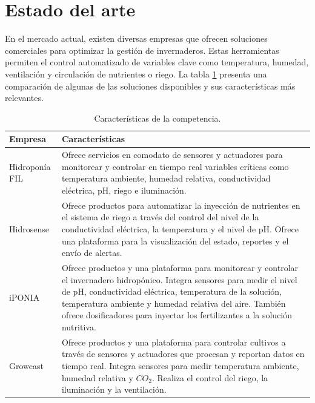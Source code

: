 
\section{Estado del arte}

En el mercado actual, existen diversas empresas que ofrecen soluciones
comerciales para optimizar la gestión de invernaderos. Estas herramientas
permiten el control automatizado de variables clave como temperatura, humedad,
ventilación y circulación de nutrientes o riego. La tabla \ref{tab:competencia}
presenta una comparación de algunas de las soluciones disponibles y sus
características más relevantes.

\begin{table}[ht]
      \centering
      \caption{Características de la competencia.}
      \begin{tabular}{|p{3.2cm}|p{9.6cm}|}
            \hline
            \rowcolor[HTML]{C0C0C0}
            Empresa                                              & Características                                                                  \\ \hline
            \multirow{1}{*}{Hidroponía FIL \cite{HidroponiaFIL}} & Ofrece servicios en comodato de sensores y actuadores
            para monitorear y controlar en tiempo real variables críticas como temperatura ambiente, humedad relativa, conductividad
            eléctrica, pH, riego e iluminación.                                                                                                     \\ \hline
            \multirow{1}{*}{Hidrosense \cite{Hidrosense}}        & Ofrece productos para automatizar la inyección de nutrientes en el sistema
            de riego a través del control del nivel de la conductividad eléctrica, la temperatura y el nivel de pH. Ofrece una plataforma para la
            visualización del estado, reportes y el envío de alertas.                                                                               \\ \hline
            \multirow{1}{*}{iPONIA \cite{iPonia}}                & Ofrece productos y una plataforma para monitorear y controlar el invernadero
            hidropónico. Integra sensores para medir el nivel de pH, conductividad eléctrica, temperatura de la solución, temperatura ambiente
            y humedad relativa del aire. También ofrece dosificadores para inyectar los fertilizantes a la solución nutritiva.                      \\ \hline
            \multirow{1}{*}{Growcast \cite{Growcast}}            & Ofrece productos y una plataforma para controlar cultivos a través de sensores y
            actuadores que procesan y reportan datos en tiempo real. Integra sensores para medir temperatura ambiente, humedad relativa y
            $CO_2$. Realiza el control del riego, la iluminación y la ventilación.                                                                  \\ \hline
      \end{tabular}
      \label{tab:competencia}
\end{table}

